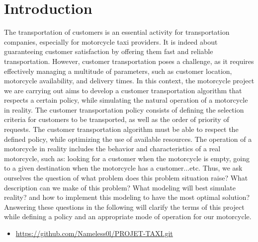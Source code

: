 \section{Introduction}




The transportation of customers is an essential activity for transportation companies, especially for motorcycle taxi providers. It is indeed about guaranteeing customer satisfaction by offering them fast and reliable transportation.
However, customer transportation poses a challenge, as it requires effectively managing a multitude of parameters, such as customer location, motorcycle availability, and delivery times.
In this context, the motorcycle project we are carrying out aims to develop a customer transportation algorithm that respects a certain policy, while simulating the natural operation of a motorcycle in reality.
The customer transportation policy consists of defining the selection criteria for customers to be transported, as well as the order of priority of requests. The customer transportation algorithm must be able to respect the defined policy, while optimizing the use of available resources. The operation of a motorcycle in reality includes the behavior and characteristics of a real motorcycle, such as: looking for a customer when the motorcycle is empty, going to a given destination when the motorcycle has a customer...etc. Thus, we ask ourselves the question of what problem does this problem situation raise? What description can we make of this problem? What modeling will best simulate reality? and how to implement this modeling to have the most optimal solution?
Answering these questions in the following will clarify the terms of this project while defining a policy and an appropriate mode of operation for our motorcycle.



\begin{multicols}{}
    \begin{itemize}
   
        \item \bgtext\href{https://github.com/Nameless0l/PROJET-TAXI.git}{https://github.com/Nameless0l/PROJET-TAXI.git}
    \end{itemize}
    \end{multicols}